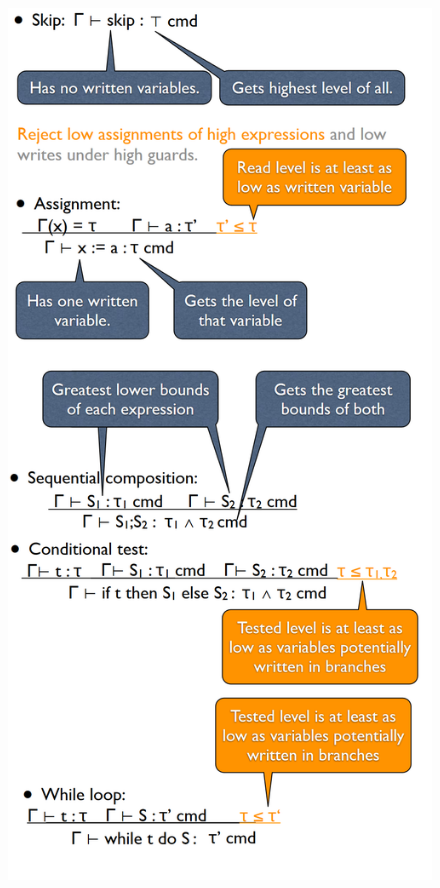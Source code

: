 \documentclass[10pt,a4paper]{report}
\begin{document}
\begin{figure}[H]
\centering
\includegraphics[scale=0.35]{23.png}
\end{figure}
\end{document}
